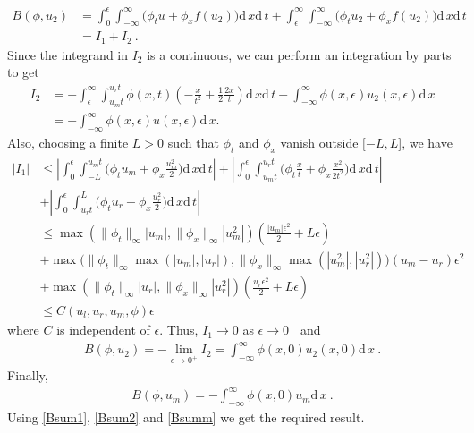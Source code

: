 \documentclass[10pt,letterpaper]{article}
\newcommand{\dif}[1][]{\mathrm{d} {#1}\,}
\newcommand{\frb}[1]{ \left(  {#1} \right) }
\theoremstyle{break}
\begin{document}
\begin{solution}
	\begin{align}
	B\frb{\phi,u_2} &=  \int_0^\epsilon \int_{-\infty}^\infty \Big(\phi_t u +\phi_x f\frb{u_2}\Big)\dif x\dif t +  \int_\epsilon^\infty \int_{-\infty}^\infty \Big(\phi_t u_2 +\phi_x f\frb{u_2}\Big)\dif x\dif t \\
	 & = I_1 + I_2 \ .
	\end{align}
	Since the integrand in $I_2$ is a continuous, we can perform an integration by parts to get
	\begin{align}
	I_2 &= - \int_\epsilon^\infty \int_{u_m t}^{u_r t} \phi(x,t) \left( - \frac{x}{t^2} + \frac{1}{2} \frac{2 x}{t} \right) \dif x \dif t - \int_{-\infty}^\infty \phi(x,\epsilon) u_2(x,\epsilon) \dif x  \\
		& = - \int_{-\infty}^\infty \phi(x,\epsilon) u(x,\epsilon) \dif x.
	\end{align}
	Also, choosing a finite $L>0$ such that $\phi_t$ and $\phi_x$ vanish outside $[-L,L$], we have
	\begin{align}
	|I_1| &\leq \left| \int_0^\epsilon \int_{-L}^{u_mt} \Big(\phi_t u_m +\phi_x \frac{u_m^2}{2}\Big)\dif x\dif t \right| + \left| \int_0^\epsilon \int_{u_mt}^{u_rt} \Big(\phi_t \frac{x}{t} +\phi_x \frac{x^2}{2t^2}\Big)\dif x\dif t \right|  \\
	&+ \left| \int_0^\epsilon \int_{u_rt}^L \Big(\phi_t u_r +\phi_x \frac{u_r^2}{2}\Big)\dif x\dif t \right| \\
	&\leq \max{(\|\phi_t\|_\infty|u_m|,\|\phi_x\|_\infty|u_m^2|)} \left( \frac{|u_m| \epsilon^2}{2} + L \epsilon \right) \\
	& + \max{\big(\|\phi_t\|_\infty \max(|u_m|,|u_r|),\|\phi_x\|_\infty \max(|u_m^2|,|u_r^2|)\big)} (u_m - u_r) \epsilon^2 \\
	& + \max{(\|\phi_t\|_\infty|u_r|,\|\phi_x\|_\infty|u_r^2|)} \left( \frac{u_r \epsilon^2}{2} + L \epsilon \right) \\
	& \leq C(u_l,u_r, u_m, \phi) \epsilon
	\end{align}
	where $C$ is independent of $\epsilon$. Thus, $I_1 \rightarrow 0$ as $\epsilon \rightarrow 0^+$ and
	\begin{gather} \label{Bsum2}
		B\frb{\phi,u_2}= - \lim \limits_{\epsilon \rightarrow 0^+} I_2 = \int_{-\infty}^{\infty} \phi(x,0) u_2(x,0) \dif x\ .
	\end{gather}
	Finally, 
	\begin{gather} \label{Bsumm}
		B\frb{\phi,u_m}= - \int_{-\infty}^{\infty} \phi(x,0) u_m \dif x\ .
	\end{gather}
	Using \eqref{Bsum1}, \eqref{Bsum2} and \eqref{Bsumm} we get the required result.
\end{solution}
\end{document}
